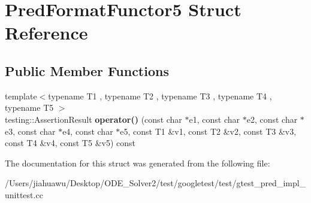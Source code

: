 \hypertarget{struct_pred_format_functor5}{}\section{Pred\+Format\+Functor5 Struct Reference}
\label{struct_pred_format_functor5}
\subsection*{Public Member Functions}
\begin{DoxyCompactItemize}
\item 
\mbox{\label{struct_pred_format_functor5_a0fe9e8e9ae614ea577cf1b34e9cfde58}} 
{\footnotesize template$<$typename T1 , typename T2 , typename T3 , typename T4 , typename T5 $>$ }\\testing\+::\+Assertion\+Result {\bfseries operator()} (const char $\ast$e1, const char $\ast$e2, const char $\ast$e3, const char $\ast$e4, const char $\ast$e5, const T1 \&v1, const T2 \&v2, const T3 \&v3, const T4 \&v4, const T5 \&v5) const
\end{DoxyCompactItemize}


The documentation for this struct was generated from the following file\+:\begin{DoxyCompactItemize}
\item 
/\+Users/jiahuawu/\+Desktop/\+O\+D\+E\+\_\+\+Solver2/test/googletest/test/gtest\+\_\+pred\+\_\+impl\+\_\+unittest.\+cc\end{DoxyCompactItemize}
